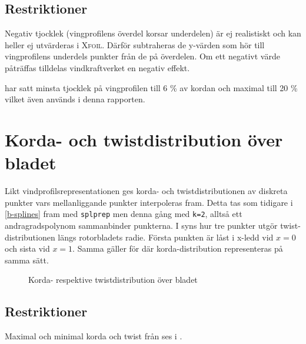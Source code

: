 \subsection{Restriktioner}

Negativ tjocklek (vingprofilens överdel korsar underdelen) är ej realistiskt och kan heller ej utvärderas i \textsc{Xfoil}. Därför subtraheras de y-värden som hör till vingprofilens underdels punkter från de på överdelen. Om ett negativt värde påträffas tilldelas vindkraftverket en negativ effekt.

\citet{Victoria} har satt minsta tjocklek på vingprofilen till 6 \% av kordan och maximal till 20 \% vilket även används i denna rapporten. 

\pagebreak

\section{Korda- och twistdistribution över bladet}

Likt vindprofilsrepresentationen ges korda- och twistdistributionen av diskreta punkter vars mellanliggande punkter interpoleras fram. Detta tas som tidigare i \ref{b-splines} fram med \lstinline[breaklines=true]!splprep! men denna gång med \lstinline[breaklines=true]!k=2!, alltså ett andragradspolynom sammanbinder punkterna. I  syns hur tre punkter utgör twist-distributionen längs rotorbladets radie. Första punkten är låst i x-ledd vid $x = 0$ och sista vid $x = 1$. Samma gäller för  där korda-distribution representeras på samma sätt.

\begin{figure}[!h]
  \centering
  \caption{Korda- respektive twistdistribution över bladet}
\end{figure}


\subsection{Restriktioner}

Maximal och minimal korda och twist från \citet{Victoria} ses i .

